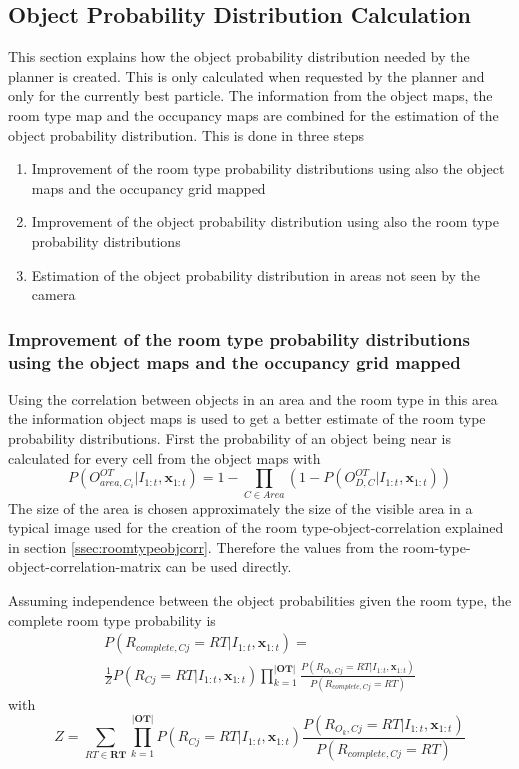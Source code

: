 \subsection{Object Probability Distribution Calculation}

This section explains how the object probability distribution needed by the planner is created. This is only calculated when requested by the planner and only for the currently best particle. The information from the object maps, the room type map and the occupancy maps are combined for the estimation of the object probability distribution. This is done in three steps
\begin{enumerate}
 \item Improvement of the room type probability distributions using also the object maps and the occupancy grid mapped
 \item Improvement of the object probability distribution using also the room type probability distributions
 \item Estimation of the object probability distribution in areas not seen by the camera
\end{enumerate}

\subsubsection{Improvement of the room type probability distributions using the object maps and the occupancy grid mapped}

Using the correlation between objects in an area and the room type in this area the information object maps is used to get a better estimate of the room type probability distributions. First the probability of an object being near is calculated for every cell from the object maps with
\begin{equation}
P(O_{area, C_i}^{OT}|I_{1:t},\mathbf{x}_{1:t})=1-\prod_{C \in Area} (1-P(O_{D,C}^{OT}|I_{1:t},\mathbf{x}_{1:t}))
\end{equation}
The size of the area is chosen approximately the size of the visible area in a typical image used for the creation of the room type-object-correlation explained in section \ref{ssec:roomtypeobjcorr}. Therefore the values from the room-type-object-correlation-matrix can be used directly.

Assuming independence between the object probabilities given the room type, the complete room type probability is
\begin{multline}
P(R_{complete,Cj}=RT|I_{1:t},\mathbf{x}_{1:t}) = \\ \frac{1}{Z}P(R_{Cj}=RT | I_{1:t}, \mathbf{x}_{1:t})\prod_{k=1}^{|\mathbf{OT}|}\frac{P(R_{O_k,Cj}=RT|I_{1:t},\mathbf{x}_{1:t})}{P(R_{complete,Cj}=RT)}
\end{multline}
with 
\begin{equation}
Z=\sum_{RT \in \mathbf{RT}}\prod_{k=1}^{|\mathbf{OT}|}P(R_{Cj}=RT | I_{1:t}, \mathbf{x}_{1:t})\frac{P(R_{O_k,Cj}=RT|I_{1:t},\mathbf{x}_{1:t})}{P(R_{complete,Cj}=RT)}
\end{equation}

